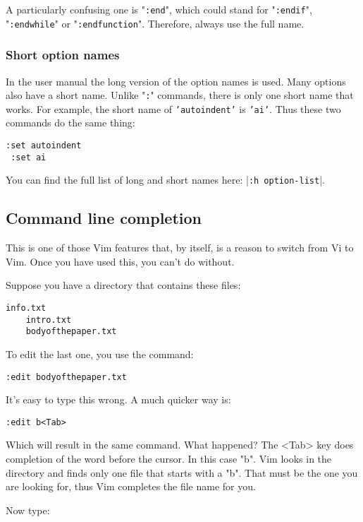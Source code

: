 A particularly confusing one is "\texttt{:end}", which could stand for "\texttt{:endif}", "\texttt{:endwhile}" or "\texttt{:endfunction}".
Therefore, always use the full name.
\subsubsection{Short option names}
In the user manual the long version of the option names is used.
Many options also have a short name.
Unlike "\texttt{:}" commands, there is only one short name that works.
For example, the short name of \texttt{'autoindent'} is \texttt{'ai'}.
Thus these two commands do the same thing:

\begin{Verbatim}[samepage=true]
 :set autoindent
 :set ai
\end{Verbatim}

You can find the full list of long and short names here: |\texttt{:h option-list}|.
\subsection{Command line completion}
This is one of those Vim features that, by itself, is a reason to switch from Vi to Vim.
Once you have used this, you can't do without.

Suppose you have a directory that contains these files:

\begin{Verbatim}[samepage=true]
    info.txt
    intro.txt
    bodyofthepaper.txt
\end{Verbatim}

To edit the last one, you use the command:

\begin{Verbatim}[samepage=true]
 :edit bodyofthepaper.txt
\end{Verbatim}

It's easy to type this wrong.
A much quicker way is:

\begin{Verbatim}[samepage=true]
 :edit b<Tab>
\end{Verbatim}

Which will result in the same command.
What happened?
The <Tab> key does completion of the word before the cursor.
In this case "b".
Vim looks in the directory and finds only one file that starts with a "b".
That must be the one you are looking for, thus Vim completes the file name for you.

Now type:

